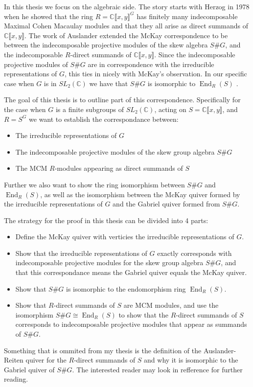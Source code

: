 \documentclass[11pt, a4paper, english]{article}
\theoremstyle{definition}
\newcommand{\C}{\mathbb{C}}
\DeclareMathOperator{\End}{End}
\begin{document}
In this thesis we focus on the algebraic side. The story starts with Herzog in 1978 \cite{Her78} when he showed that the ring $R = \C\llbracket x, y \rrbracket^G$ has finitely many indecomposable Maximal Cohen Macaulay modules and that they all arise as direct summands of $\C\llbracket x, y \rrbracket$. The work of Auslander \cite{Aus86} extended the McKay correspondence to be between the indecomposable projective modules of the skew algebra $S\#G$, and the indecomposable $R$-direct summands of $\C\llbracket x, y \rrbracket$. Since the indecomposable projective modules of $S\#G$ are in correspondence with the irreducible representations of $G$, this ties in nicely with McKay's observation. In our specific case when $G$ is in $SL_2(\C)$ we have that $S\#G$ is isomorphic to $\End_R(S)$ \cite{AG60, Aus62}.

The goal of this thesis is to outline part of this correspondence. Specifically for the case when $G$ is a finite subgroups of $SL_2(\C)$, acting on $S = \C\llbracket x, y \rrbracket$, and $R = S^G$ we want to establish the correspondance between:
\begin{itemize}
\item The irreducible representations of $G$
\item The indecomposable projective modules of the skew group algebra $S\#G$
\item The MCM $R$-modules appearing as direct summands of $S$
\end{itemize}
Further we also want to show the ring isomorphism between $S\#G$ and $\End_R(S)$, as well as the isomorphism between the McKay quiver formed by the irreducible representations of $G$ and the Gabriel quiver formed from $S\#G$.

The strategy for the proof in this thesis can be divided into 4 parts:
\begin{itemize}
\item Define the McKay quiver with verticies the irreducible representations of $G$.
\item Show that the irreducible representations of $G$ exactly corresponds with indecomposable projective modules for the skew group algebra $S\#G$, and that this correspondance means the Gabriel quiver equals the McKay quiver.
\item Show that $S\#G$ is isomorphic to the endomorphism ring $\End_R(S)$.
\item Show that $R$-direct summands of $S$ are MCM modules, and use the isomorphism $S\#G \cong \End_R(S)$ to show that the $R$-direct summands of $S$ corresponds to indecomposable projective modules that appear as summands of $S\#G$.
\end{itemize}
Something that is ommited from my thesis is the definition of the Auslander-Reiten quiver for the $R$-direct summands of $S$ and why it is isomorphic to the Gabriel quiver of $S\#G$. The interested reader may look in {\color{red} refference} for further reading.
\end{document}
